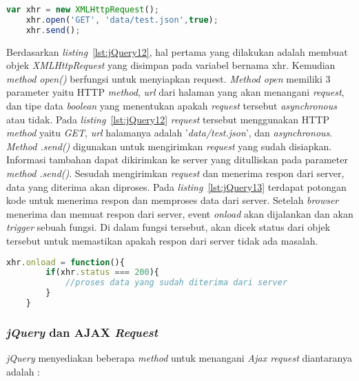 \begin{lstlisting}[language=Javascript, caption=Membuat \textit{Ajax request} , label={lst:jQuery12}]
	var xhr = new XMLHttpRequest();
	xhr.open('GET', 'data/test.json',true);
	xhr.send();
\end{lstlisting}

Berdasarkan \textit{listing}~\ref{lst:jQuery12}, hal pertama yang dilakukan adalah membuat objek \textit{XMLHttpRequest} yang disimpan pada variabel bernama xhr. Kemudian \textit{method open()} berfungsi untuk menyiapkan request. \textit{Method open} memiliki 3 parameter yaitu HTTP \textit{method}, \textit{url} dari halaman yang akan menangani \textit{request}, dan tipe data \textit{boolean} yang menentukan apakah \textit{request} tersebut \textit{asynchronous} atau tidak. Pada \textit{listing}~\ref{lst:jQuery12} \textit{request} tersebut menggunakan HTTP \textit{method} yaitu \textit{GET}, \textit{url} halamanya adalah '\textit{data/test.json}', dan \textit{asynchronous}. \textit{Method .send()} digunakan untuk mengirimkan \textit{request} yang sudah disiapkan. Informasi tambahan dapat dikirimkan ke server yang ditulliskan pada parameter \textit{method .send()}. Sesudah mengirimkan \textit{request} dan menerima respon dari server, data yang diterima akan diproses. Pada \textit{listing}~\ref{lst:jQuery13} terdapat potongan kode untuk menerima respon dan memproses data dari server. Setelah \textit{browser} menerima dan memuat respon dari server, event \textit{onload} akan dijalankan dan akan \textit{trigger} sebuah fungsi. Di dalam fungsi tersebut, akan dicek status dari objek tersebut untuk memastikan apakah respon dari server tidak ada masalah. 

\begin{lstlisting}[language=Javascript, caption=Memproses respon yang didapat dari server, label={lst:jQuery13}]
	xhr.onload = function(){
		if(xhr.status === 200){
			//proses data yang sudah diterima dari server
		}
	}
\end{lstlisting}

\subsubsection{\textit{jQuery} dan AJAX \textit{Request}}
\textit{jQuery} menyediakan beberapa \textit{method} untuk menangani \textit{Ajax request} diantaranya adalah :

